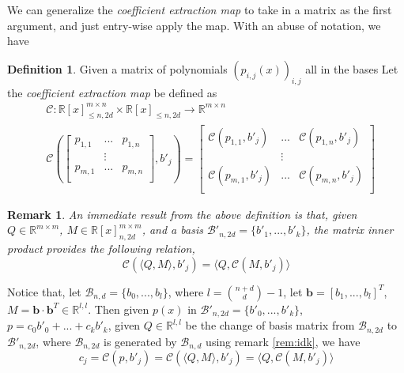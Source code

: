 \documentclass[12pt]{amsart}
\numberwithin{equation}{section}
\newtheorem{remark}[thm]{Remark}
\theoremstyle{definition}
\newtheorem{definition}[thm]{Definition}
\numberwithin{thm}{section}
\begin{document}
\smallskip 
We can generalize the \emph{coefficient extraction map} to take in a matrix as the first argument, and just entry-wise apply the map. With an abuse of notation, we have 
\begin{definition}
     Given a matrix of polynomials $(p_{i, j}(x))_{i, j}$ all in the bases Let the \emph{coefficient extraction map} be defined as 
     \begin{equation*}
          \begin{split}
               & \mathcal{C}: \mathbb{R}[x]_{\leq n, 2d}^{m \times n} \times \mathbb{R}[x]_{\leq n, 2d} \rightarrow \mathbb{R}^{m \times n} \\
               & \mathcal{C}(
                    \begin{bmatrix} 
                         p_{1, 1} & ... & p_{1, n} \\
                         & \vdots \\
                         p_{m, 1} & ... & p_{m, n} \\
                    \end{bmatrix}, b'_j
               ) = \begin{bmatrix} 
                    \mathcal{C}(p_{1, 1}, b'_j) & ... &  \mathcal{C}(p_{1, n}, b'_j) \\
                    & \vdots \\
                    \mathcal{C}(p_{m, 1}, b'_j) & ... &  \mathcal{C}(p_{m, n}, b'_j) \\
                    \end{bmatrix}
          \end{split}
     \end{equation*}
\end{definition}

\begin{remark}
     An immediate result from the above definition is that, given $Q \in \mathbb{R}^{m \times m}$, $M \in \mathbb{R}[x]_{n, 2d}^{m \times m}$, 
     and a basis $\mathcal{B}'_{n, 2d} = \{b'_1, ..., b'_k\}$, the matrix inner product provides the following relation,
     \begin{equation*}
          \mathcal{C}(\langle Q, M \rangle, b'_j) = \langle Q, \mathcal{C}(M, b'_j) \rangle
     \end{equation*}
\end{remark}

\smallskip
Notice that, let $\mathcal{B}_{n, d} = \{b_0,...,b_l\}$, where $l = {n + d \choose d} - 1$, 
let $\mathbf{b} = [b_1, ..., b_l]^T$, $M = \mathbf{b} \cdot \mathbf{b}^T \in \mathbb{R}^{l, l}$. 
Then given $p(x)$ in $\mathcal{B}'_{n, 2d} = \{b'_0, ..., b'_k\}$, $p = c_0b'_0 + ... + c_k b'_k$, 
given $Q \in \mathbb{R}^{l, l}$ be the change of basis matrix from $\mathcal{B}_{n, 2d}$ to $\mathcal{B}'_{n, 2d}$, 
where $\mathcal{B}_{n, 2d}$ is generated by $\mathcal{B}_{n, d}$ using remark \ref{rem:idk}, we have
\begin{equation}
     c_j = \mathcal{C}(p, b'_j) = \mathcal{C}(\langle Q, M \rangle, b'_j ) = \langle Q, \mathcal{C}(M, b'_j) \rangle
\end{equation}
\end{document}
